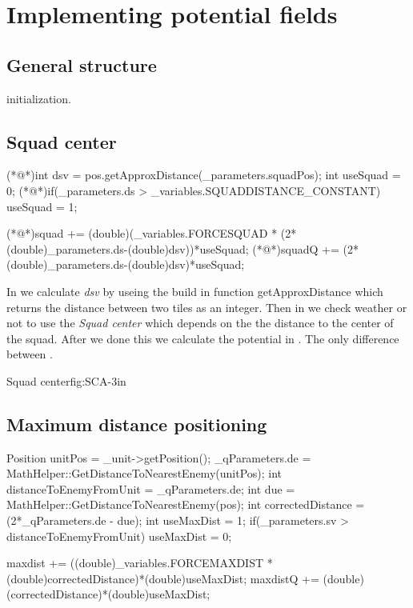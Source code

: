\section{Implementing potential fields}
	
	\subsection{General structure}
	initialization.
	 
	
	\subsection{Squad center}	
		\begin{Sourcecode}[caption=Squad center]
(*@\lnote@*)int dsv = pos.getApproxDistance(_parameters.squadPos);	
int useSquad = 0;
(*@\lnote@*)if(_parameters.ds > _variables.SQUADDISTANCE_CONSTANT)
	useSquad = 1;

(*@\lnote@*)squad += (double)(_variables.FORCESQUAD * (2*(double)_parameters.ds-(double)dsv))*useSquad;
(*@\lnote@*)squadQ += (2*(double)_parameters.ds-(double)dsv)*useSquad;
\end{Sourcecode}
		In  we calculate \textit{dsv} by useing the build in function getApproxDistance which returns the distance between two tiles as an integer.
		Then in  we check weather or not to use the \textit{Squad center} which depends on the the distance to the center of the squad.
		After we done this we calculate the potential in . The only difference between .

			{Squad center}{fig:SCA}{-3in}
			
	\subsection{Maximum distance positioning}
		\begin{Sourcecode}[caption=Maximum distance]
Position unitPos = _unit->getPosition();
_qParameters.de = MathHelper::GetDistanceToNearestEnemy(unitPos);
int distanceToEnemyFromUnit = _qParameters.de;
int due = MathHelper::GetDistanceToNearestEnemy(pos);
int correctedDistance = (2*_qParameters.de - due);
int useMaxDist = 1;
if(_parameters.sv > distanceToEnemyFromUnit)
	useMaxDist = 0;


maxdist += ((double)_variables.FORCEMAXDIST * (double)correctedDistance)*(double)useMaxDist;
maxdistQ += (double)(correctedDistance)*(double)useMaxDist;
\end{Sourcecode}
	
